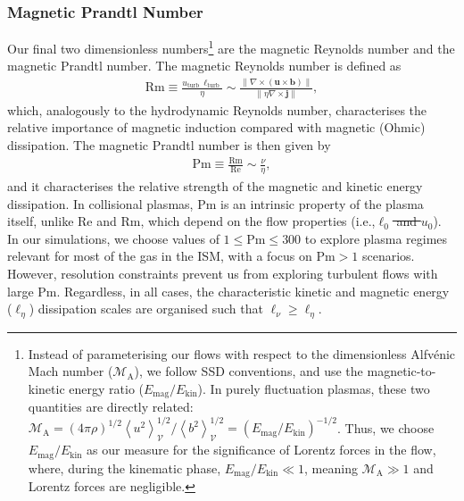 \documentclass[12pt,twoside]{extreport}
\makeatletter
\newcommand{\mAve}[1]{\left\langle #1 \right\rangle} %
\newcommand{\mVector}[1]{\bm{#1}} %
\newcommand{\mReh}{\ensuremath{\mathrm{Re}}} %
\newcommand{\mRem}{\ensuremath{\mathrm{Rm}}} %
\newcommand{\mPrm}{\ensuremath{\mathrm{Pm}}} %
\newcommand{\mAlfvenMach}{\ensuremath{\mathcal{M}_{\mathrm{A}}}} %
\newcommand{\mVolume}{\ensuremath{\mathcal{V}}} %
\newcommand{\ie}{i.e.,\xspace} %
\providecommand{\DIFaddtex}[1]{{\protect\color{DIFgreen}\uwave{#1}}} %
\providecommand{\DIFdeltex}[1]{{\protect\color{DIFpurple}\sout{#1}}} %
\providecommand{\DIFaddbegin}{} %
\providecommand{\DIFaddend}{} %
\providecommand{\DIFdelbegin}{} %
\providecommand{\DIFdelend}{} %
\providecommand{\DIFadd}[1]{\texorpdfstring{\DIFaddtex{#1}}{#1}} %
\providecommand{\DIFdel}[1]{\texorpdfstring{\DIFdeltex{#1}}{}} %
\providecommand{\DIFscaledelfig}{0.5}
\newlength{\DIFdelgraphicswidth} %
\newlength{\DIFdelgraphicsheight} %
\providecommand{\DIFaddincludegraphics}[2][]{{\color{DIFgreen}\fbox{\DIFOincludegraphics[#1]{#2}}}} %
\providecommand{\DIFdelincludegraphics}[2][]{%
\sbox{\DIFdelgraphicsbox}{\DIFOincludegraphics[#1]{#2}}%
\settoboxwidth{\DIFdelgraphicswidth}{\DIFdelgraphicsbox} %
\settoboxtotalheight{\DIFdelgraphicsheight}{\DIFdelgraphicsbox} %
\scalebox{\DIFscaledelfig}{%
\parbox[b]{\DIFdelgraphicswidth}{\usebox{\DIFdelgraphicsbox}\\[-\baselineskip] \rule{\DIFdelgraphicswidth}{0em}}\llap{\resizebox{\DIFdelgraphicswidth}{\DIFdelgraphicsheight}{%
\setlength{\unitlength}{\DIFdelgraphicswidth}%
\begin{picture}(1,1)%
\thicklines\linethickness{2pt} %
{\color{DIFpurple}\put(0,0){\framebox(1,1){}}}%
{\color{DIFpurple}\put(0,0){\line( 1,1){1}}}%
{\color{DIFpurple}\put(0,1){\line(1,-1){1}}}%
\end{picture}%
}\hspace*{3pt}}} %
} %
\DeclareRobustCommand{\DIFaddbegin}{\DIFOaddbegin \let\includegraphics\DIFaddincludegraphics} %
\DeclareRobustCommand{\DIFaddend}{\DIFOaddend \let\includegraphics\DIFOincludegraphics} %
\DeclareRobustCommand{\DIFdelbegin}{\DIFOdelbegin \let\includegraphics\DIFdelincludegraphics} %
\DeclareRobustCommand{\DIFdelend}{\DIFOaddend \let\includegraphics\DIFOincludegraphics} %
\let\sout@orig\sout %
\renewcommand{\sout}[1]{\ifmmode\text{\sout@orig{\ensuremath{#1}}}\else\sout@orig{#1}\fi} %
\makeatother
\begin{document}
\subsubsection{Magnetic Prandtl Number}
\label{sec:ICs:Pm}

Our final two dimensionless numbers\footnote{
    Instead of parameterising our flows with respect to the dimensionless Alfv\'enic Mach number ($\mAlfvenMach$), we follow SSD conventions, and use the magnetic-to-kinetic energy ratio ($E_\mathrm{mag} / E_\mathrm{kin}$). In purely fluctuation plasmas, these two quantities are directly related: $\mAlfvenMach = (4\pi \rho)^{1/2} \mAve{u^2}_\mVolume^{1/2} / \mAve{b^2}_\mVolume^{1/2} = (E_\mathrm{mag} / E_\mathrm{kin})^{-1/2}$. Thus, we choose $E_\mathrm{mag} / E_\mathrm{kin}$ as our measure for the significance of Lorentz forces in the flow, where, during the kinematic phase, $E_\mathrm{mag} / E_\mathrm{kin} \ll 1$, meaning $\mAlfvenMach \gg 1$ and Lorentz forces are negligible.
} are the magnetic Reynolds number and the magnetic Prandtl number. The magnetic Reynolds number is defined as
\DIFdelbegin %
\DIFdelend \DIFaddbegin \begin{align}
    \mRem
        \equiv \frac{u_\mathrm{turb} \,\ell_\mathrm{turb}}{\eta}
        \sim \frac{
                \|\nabla\times(\mVector{u}\times\mVector{b})\|
            }{
                \|\eta\nabla\times\mVector{j}\|
            }
        , \label{dfn:Reym}
\end{align}\DIFaddend
which, analogously to the hydrodynamic Reynolds number, characterises the relative importance of magnetic induction compared with magnetic (Ohmic) dissipation. The magnetic Prandtl number is then given by
\begin{align}
    \mPrm
        \equiv \frac{\mRem}{\mReh}
        \sim \frac{\nu}{\eta}
        , \label{dfn:Pranm}
\end{align}
and it characterises the relative strength of the magnetic and kinetic energy dissipation. In collisional plasmas, $\mPrm$ is an intrinsic property of the plasma itself, unlike $\mReh$ and $\mRem$, which depend on the flow properties (\ie \DIFdelbegin \DIFdel{$\ell_0$ and $u_0$}\DIFdelend \DIFaddbegin \DIFadd{$\ell_\mathrm{turb}$ and $u_\mathrm{turb}$}\DIFaddend ). In our simulations, we choose values of $1 \leq \mPrm \leq 300$ to explore plasma regimes relevant for most of the gas in the ISM, with a focus on $\mPrm > 1$ scenarios. However, resolution constraints prevent us from exploring turbulent flows with large $\mPrm$. Regardless, in all cases, the characteristic kinetic and magnetic energy ($\ell_\eta$) dissipation scales are organised such that $\ell_\nu \geq \ell_\eta$.
\end{document}
